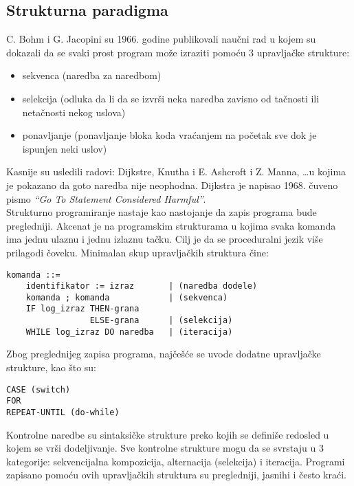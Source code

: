 \documentclass[../main.tex]{subfiles}
\begin{document}
\subsection{Strukturna paradigma}
C. Bohm i G. Jacopini su 1966. godine publikovali naučni rad u kojem su dokazali da se svaki prost program može izraziti pomoću 3 upravljačke strukture:
\begin{itemize}
\item sekvenca (naredba za naredbom)
\item selekcija (odluka da li da se izvrši neka naredba zavisno od tačnosti ili netačnosti nekog uslova)
\item ponavljanje (ponavljanje bloka koda vraćanjem na početak sve dok je ispunjen neki uslov)
\end{itemize}
Kasnije su usledili radovi: Dijkstre, Knutha i E. Ashcroft i Z. Manna, \ldots u kojima je pokazano da goto naredba nije neophodna. Dijkstra je napisao 1968. čuveno pismo {\it ``Go To Statement Considered Harmful''}.\\
Strukturno programiranje nastaje kao nastojanje da zapis programa bude pregledniji. Akcenat je na programskim strukturama u kojima svaka komanda ima jednu ulaznu i jednu izlaznu tačku. Cilj je da se proceduralni jezik više prilagodi čoveku. Minimalan skup upravljačkih struktura čine:
\begin{Verbatim}
komanda ::=
	identifikator := izraz       | (naredba dodele)
	komanda ; komanda            | (sekvenca)
	IF log_izraz THEN-grana
	             ELSE-grana      | (selekcija)
	WHILE log_izraz DO naredba   | (iteracija)
\end{Verbatim}

\pagebreak
Zbog preglednijeg zapisa programa, najčešće se uvode dodatne upravljačke strukture, kao što su:
\begin{Verbatim}
CASE (switch)
FOR
REPEAT-UNTIL (do-while)
\end{Verbatim}
Kontrolne naredbe su sintaksičke strukture preko kojih se definiše redosled u kojem se vrši dodeljivanje. Sve kontrolne strukture mogu da se svrstaju u 3 kategorije: sekvencijalna kompozicija, alternacija (selekcija) i iteracija.
Programi zapisano pomoću ovih upravljačkih struktura su pregledniji, jasnihi i često kraći. 
\end{document}
